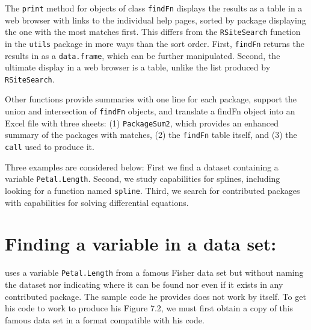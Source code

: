 The {\tt print} method for objects of class {\tt findFn}
displays the results as a table in a web
browser with links to the individual help pages, sorted by package
displaying the one with the most matches first.  This
differs from the {\tt RSiteSearch} function in the {\tt utils}
package in more ways than the sort
order.  First, {\tt findFn} returns
the results in \R{} as a {\tt data.frame}, which can be further
manipulated.  Second, the ultimate display in a web browser is a
table, unlike the list produced by {\tt RSiteSearch}.

Other  functions provide summaries with one line for each
package, support the union and intersection of {\tt findFn} objects,
and translate a findFn object into an Excel file with three sheets:  (1)
{\tt PackageSum2}, which provides an enhanced summary of the packages
with matches, (2) the {\tt findFn} table itself, and (3) the {\tt call}
used to produce it.

Three examples are considered below:  First we find a dataset
containing a variable {\tt Petal.Length}. Second, we study
\R{} capabilities for splines, including looking for a function
named {\tt spline}.  Third, we search for contributed \R{} packages
 with capabilities for solving differential equations.

\section{Finding a variable in a data set:  }

\citet[pp. 282-283]{JC09} uses a variable {\tt Petal.Length} from a
famous Fisher data set but without naming the dataset nor indicating
where it can be found nor even if it exists in any contributed \R{}
package.  The sample code he provides does not work by itself.  To get
his code to  work to produce his Figure 7.2, we must first obtain a
copy of this famous data set in a format compatible with his code.

